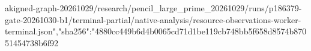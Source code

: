 \documentclass[10pt]{article}
\begin{document}
ak{}i\allowbreak{}g\allowbreak{}n\allowbreak{}e\allowbreak{}d\allowbreak{}-\allowbreak{}g\allowbreak{}r\allowbreak{}a\allowbreak{}p\allowbreak{}h\allowbreak{}-\allowbreak{}2\allowbreak{}0\allowbreak{}2\allowbreak{}6\allowbreak{}1\allowbreak{}0\allowbreak{}2\allowbreak{}9\allowbreak{}/\allowbreak{}r\allowbreak{}e\allowbreak{}s\allowbreak{}e\allowbreak{}a\allowbreak{}r\allowbreak{}c\allowbreak{}h\allowbreak{}/\allowbreak{}p\allowbreak{}e\allowbreak{}n\allowbreak{}c\allowbreak{}i\allowbreak{}l\allowbreak{}\_\allowbreak{}l\allowbreak{}a\allowbreak{}r\allowbreak{}g\allowbreak{}e\allowbreak{}\_\allowbreak{}p\allowbreak{}r\allowbreak{}i\allowbreak{}m\allowbreak{}e\allowbreak{}\_\allowbreak{}2\allowbreak{}0\allowbreak{}2\allowbreak{}6\allowbreak{}1\allowbreak{}0\allowbreak{}2\allowbreak{}9\allowbreak{}/\allowbreak{}r\allowbreak{}u\allowbreak{}n\allowbreak{}s\allowbreak{}/\allowbreak{}p\allowbreak{}1\allowbreak{}8\allowbreak{}6\allowbreak{}3\allowbreak{}7\allowbreak{}9\allowbreak{}-\allowbreak{}g\allowbreak{}a\allowbreak{}t\allowbreak{}e\allowbreak{}-\allowbreak{}2\allowbreak{}0\allowbreak{}2\allowbreak{}6\allowbreak{}1\allowbreak{}0\allowbreak{}3\allowbreak{}0\allowbreak{}-\allowbreak{}b\allowbreak{}1\allowbreak{}/\allowbreak{}t\allowbreak{}e\allowbreak{}r\allowbreak{}m\allowbreak{}i\allowbreak{}n\allowbreak{}a\allowbreak{}l\allowbreak{}-\allowbreak{}p\allowbreak{}a\allowbreak{}r\allowbreak{}t\allowbreak{}i\allowbreak{}a\allowbreak{}l\allowbreak{}/\allowbreak{}n\allowbreak{}a\allowbreak{}t\allowbreak{}i\allowbreak{}v\allowbreak{}e\allowbreak{}-\allowbreak{}a\allowbreak{}n\allowbreak{}a\allowbreak{}l\allowbreak{}y\allowbreak{}s\allowbreak{}i\allowbreak{}s\allowbreak{}/\allowbreak{}r\allowbreak{}e\allowbreak{}s\allowbreak{}o\allowbreak{}u\allowbreak{}r\allowbreak{}c\allowbreak{}e\allowbreak{}-\allowbreak{}o\allowbreak{}b\allowbreak{}s\allowbreak{}e\allowbreak{}r\allowbreak{}v\allowbreak{}a\allowbreak{}t\allowbreak{}i\allowbreak{}o\allowbreak{}n\allowbreak{}s\allowbreak{}-\allowbreak{}w\allowbreak{}o\allowbreak{}r\allowbreak{}k\allowbreak{}e\allowbreak{}r\allowbreak{}-\allowbreak{}t\allowbreak{}e\allowbreak{}r\allowbreak{}m\allowbreak{}i\allowbreak{}n\allowbreak{}a\allowbreak{}l\allowbreak{}.\allowbreak{}j\allowbreak{}s\allowbreak{}o\allowbreak{}n\allowbreak{}"\allowbreak{},\allowbreak{}"\allowbreak{}s\allowbreak{}h\allowbreak{}a\allowbreak{}2\allowbreak{}5\allowbreak{}6\allowbreak{}"\allowbreak{}:\allowbreak{}"\allowbreak{}4\allowbreak{}8\allowbreak{}8\allowbreak{}0\allowbreak{}c\allowbreak{}c\allowbreak{}4\allowbreak{}4\allowbreak{}9\allowbreak{}b\allowbreak{}6\allowbreak{}d\allowbreak{}4\allowbreak{}b\allowbreak{}0\allowbreak{}0\allowbreak{}6\allowbreak{}5\allowbreak{}c\allowbreak{}d\allowbreak{}7\allowbreak{}1\allowbreak{}d\allowbreak{}1\allowbreak{}b\allowbreak{}e\allowbreak{}1\allowbreak{}1\allowbreak{}9\allowbreak{}c\allowbreak{}b\allowbreak{}7\allowbreak{}4\allowbreak{}8\allowbreak{}b\allowbreak{}b\allowbreak{}5\allowbreak{}f\allowbreak{}6\allowbreak{}5\allowbreak{}8\allowbreak{}d\allowbreak{}8\allowbreak{}5\allowbreak{}7\allowbreak{}4\allowbreak{}b\allowbreak{}8\allowbreak{}7\allowbreak{}0\allowbreak{}5\allowbreak{}1\allowbreak{}4\allowbreak{}5\allowbreak{}4\allowbreak{}7\allowbreak{}3\allowbreak{}8\allowbreak{}b\allowbreak{}6\allowbreak{}f\allowbreak{}9\allowbreak{}2\allowbrea
\end{document}
